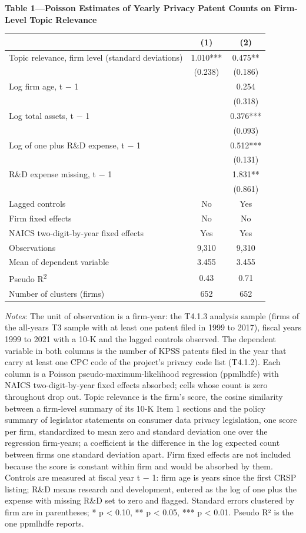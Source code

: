 \begin{table}[htbp]
\centering
\textbf{Table 1---Poisson Estimates of Yearly Privacy Patent Counts on Firm-Level Topic Relevance}\par
\begin{tabular}{lcc}
\toprule
 & (1) & (2) \\
\midrule
Topic relevance, firm level (standard deviations) & 1.010*** & 0.475** \\
 & (0.238) & (0.186) \\
Log firm age, t − 1 &  & 0.254 \\
 &  & (0.318) \\
Log total assets, t − 1 &  & 0.376*** \\
 &  & (0.093) \\
Log of one plus R\&D expense, t − 1 &  & 0.512*** \\
 &  & (0.131) \\
R\&D expense missing, t − 1 &  & 1.831** \\
 &  & (0.861) \\
\midrule
Lagged controls & No & Yes \\
Firm fixed effects & No & No \\
NAICS two-digit-by-year fixed effects & Yes & Yes \\
\midrule
Observations & 9,310 & 9,310 \\
Mean of dependent variable & 3.455 & 3.455 \\
Pseudo R\textsuperscript{2} & 0.43 & 0.71 \\
Number of clusters (firms) & 652 & 652 \\
\bottomrule
\end{tabular}
\par\textit{Notes}: The unit of observation is a firm-year: the T4.1.3 analysis sample (firms of the all-years T3 sample with at least one patent filed in 1999 to 2017), fiscal years 1999 to 2021 with a 10-K and the lagged controls observed. The dependent variable in both columns is the number of KPSS patents filed in the year that carry at least one CPC code of the project's privacy code list (T4.1.2). Each column is a Poisson pseudo-maximum-likelihood regression (ppmlhdfe) with NAICS two-digit-by-year fixed effects absorbed; cells whose count is zero throughout drop out. Topic relevance is the firm's score, the cosine similarity between a firm-level summary of its 10-K Item 1 sections and the policy summary of legislator statements on consumer data privacy legislation, one score per firm, standardized to mean zero and standard deviation one over the regression firm-years; a coefficient is the difference in the log expected count between firms one standard deviation apart. Firm fixed effects are not included because the score is constant within firm and would be absorbed by them. Controls are measured at fiscal year t − 1: firm age is years since the first CRSP listing; R\&D means research and development, entered as the log of one plus the expense with missing R\&D set to zero and flagged. Standard errors clustered by firm are in parentheses; * p < 0.10, ** p < 0.05, *** p < 0.01. Pseudo R² is the one ppmlhdfe reports.

\end{table}
